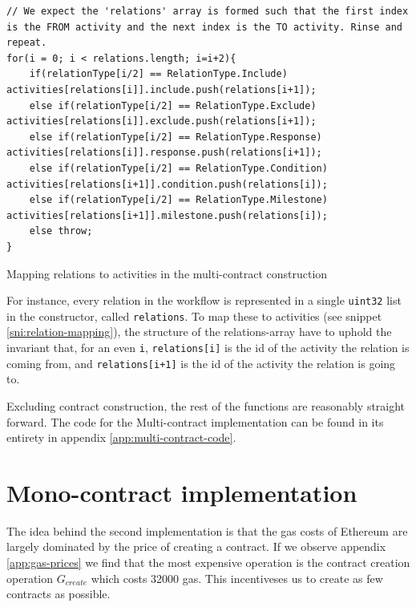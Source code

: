 \documentclass{article}
\begin{document}
				\begin{snippet}[!ht]
			\centering
			\begin{lstlisting}[language=solidity, numbers=none]
// We expect the 'relations' array is formed such that the first index is the FROM activity and the next index is the TO activity. Rinse and repeat.
for(i = 0; i < relations.length; i=i+2){
    if(relationType[i/2] == RelationType.Include)        	activities[relations[i]].include.push(relations[i+1]);
    else if(relationType[i/2] == RelationType.Exclude)   	activities[relations[i]].exclude.push(relations[i+1]);
    else if(relationType[i/2] == RelationType.Response)  	activities[relations[i]].response.push(relations[i+1]);
    else if(relationType[i/2] == RelationType.Condition) 	activities[relations[i+1]].condition.push(relations[i]);
    else if(relationType[i/2] == RelationType.Milestone) 	activities[relations[i+1]].milestone.push(relations[i]);
    else throw;
}			
			\end{lstlisting}
		 	\caption[Mapping relations to activities in the multi-contract construction]
		 	{Mapping relations to activities in the multi-contract construction}
		 	\label{sni:relation-mapping}
		\end{snippet}

		For instance, every relation in the workflow is represented in a single \texttt{uint32} list in the constructor, called \texttt{relations}. 
		To map these to activities (see snippet \ref{sni:relation-mapping}), the structure of the relations-array have to uphold the invariant that, for an even \texttt{i}, \texttt{relations[i]} is the id of the activity the relation is coming from, and \texttt{relations[i+1]} is the id of the activity the relation is going to.

		Excluding contract construction, the rest of the functions are reasonably straight forward.
		The code for the Multi-contract implementation can be found in its entirety in appendix \ref{app:multi-contract-code}.




	\section{Mono-contract implementation}
	The idea behind the second implementation is that the gas costs of Ethereum are largely dominated by the price of creating a contract. If we observe appendix \ref{app:gas-prices} we find that the most expensive operation is the contract creation operation $G_{create}$ which costs 32000 gas. 
	This incentiveses us to create as few contracts as possible. 
\end{document}
